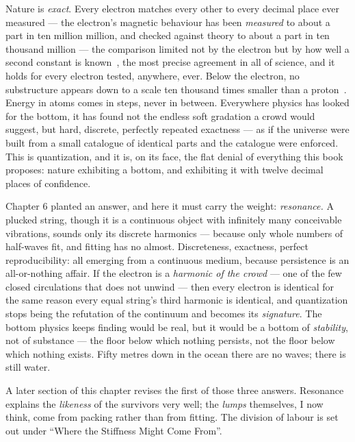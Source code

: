 \documentclass[fontsize=11pt,paper=a4,pagesize=auto,parskip=half-]{scrbook}
\begin{document}
Nature is \emph{exact}. Every electron matches every other to every decimal place ever measured --- the electron's magnetic behaviour has been \emph{measured} to about a part in ten million million, and checked against theory to about a part in ten thousand million --- the comparison limited not by the electron but by how well a second constant is known~\cite{fan2023}, the most precise agreement in all of science, and it holds for every electron tested, anywhere, ever. Below the electron, no substructure appears down to a scale ten thousand times smaller than a proton~\cite{pdg2024}. Energy in atoms comes in steps, never in between. Everywhere physics has looked for the bottom, it has found not the endless soft gradation a crowd would suggest, but hard, discrete, perfectly repeated exactness --- as if the universe were built from a small catalogue of identical parts and the catalogue were enforced. This is quantization, and it is, on its face, the flat denial of everything this book proposes: nature exhibiting a bottom, and exhibiting it with twelve decimal places of confidence.

Chapter 6 planted an answer, and here it must carry the weight: \emph{resonance.} A plucked string, though it is a continuous object with infinitely many conceivable vibrations, sounds only its discrete harmonics --- because only whole numbers of half-waves fit, and fitting has no almost. Discreteness, exactness, perfect reproducibility: all emerging from a continuous medium, because persistence is an all-or-nothing affair. If the electron is a \emph{harmonic of the crowd} --- one of the few closed circulations that does not unwind --- then every electron is identical for the same reason every equal string's third harmonic is identical, and quantization stops being the refutation of the continuum and becomes its \emph{signature}. The bottom physics keeps finding would be real, but it would be a bottom of \emph{stability}, not of substance --- the floor below which nothing persists, not the floor below which nothing exists. Fifty metres down in the ocean there are no waves; there is still water.

A later section of this chapter revises the first of those three answers. Resonance explains the \emph{likeness} of the survivors very well; the \emph{lumps} themselves, I now think, come from packing rather than from fitting. The division of labour is set out under ``Where the Stiffness Might Come From''.
\end{document}
